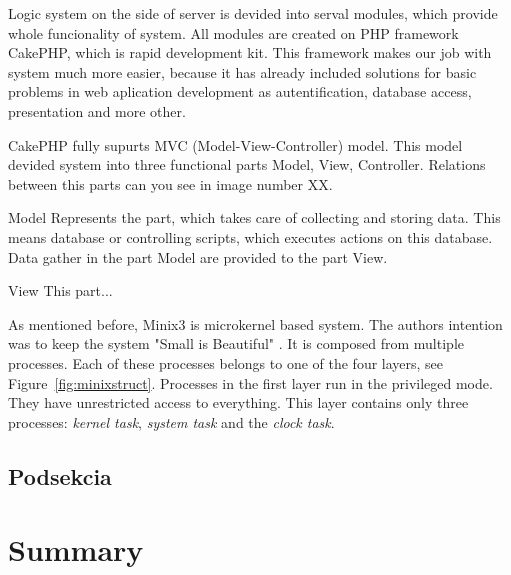 \documentclass{iitsrc}[2006/14/02]
\newcommand\fig[4]{%
	\begin{figure}[h]
	\begin{center}
	\texttt{[image: \#2]}
	~\\%
	\caption{#4}
	\label{#3}
	\end{center}
	\end{figure}
}
\begin{document}
Logic system on the side of server is devided into serval modules, which provide whole funcionality of system. All modules are created on PHP  framework CakePHP, which is rapid development kit. This framework makes our job with system much more easier, because it has already included solutions for basic problems in web aplication development as autentification, database access, presentation and more other.

CakePHP fully supurts MVC (Model-View-Controller) model. This model devided system into three functional parts Model, View, Controller. Relations between this parts can you see in image number XX.

Model
Represents the part, which takes care of collecting and storing data. This means database or controlling scripts, which executes actions on this database. Data gather in the part Model are provided to the part View.

View
This part...
 
As mentioned before, Minix3 is microkernel based system. The authors intention was to keep the system "Small is Beautiful" \cite[page 17]{osdesign}.
It is composed from multiple processes. Each of these processes belongs to one of the four layers, see Figure~\ref{fig:minixstruct}. Processes in the first layer run in the privileged mode. They have unrestricted access to everything. This layer contains only three processes: {\em kernel task}, {\em system task} and the {\em clock task}.

%
\subsection{Podsekcia}

      
\section{Summary}
\end{document}

